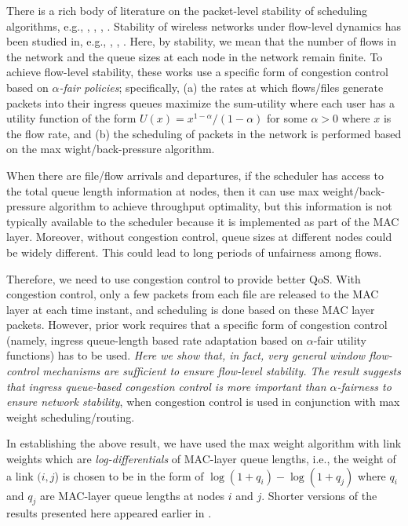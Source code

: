 \documentclass[10pt,onecolumn,draftclsnofoot,journal]{IEEEtran}
\begin{document}
There is a rich body of literature on the packet-level stability of scheduling algorithms, e.g., \cite{eph}, \cite{Neely}, \cite{KM01}, \cite{srikant}. Stability of wireless networks under flow-level dynamics
has been studied in, e.g., \cite{LNS08}, \cite{LPYCP07}, \cite{MS10}. Here, by stability, we mean
that the number of flows in the network and the queue sizes
at each node in the network remain finite. To achieve flow-level stability, these works use a specific form of congestion control based on \textit{$\alpha$-fair policies}; specifically, (a) the rates at which flows/files
generate packets into their ingress queues maximize the sum-utility where each user has a utility function of the form $U(x)=x^{1-\alpha}/(1-\alpha)$ for some $\alpha > 0$ where $x$ is the flow rate, and (b) the scheduling of packets in the network
is performed based on the max wight/back-pressure algorithm.


When there are file/flow arrivals and departures,
if the scheduler has access to the total queue length information at nodes, then it can use max weight/back-pressure algorithm to achieve throughput optimality, but this information is not typically available to the scheduler because it is implemented as part of the MAC layer. Moreover, without congestion control, queue sizes at different nodes could be widely different. This could lead to long periods of unfairness among flows.


Therefore, we need to use congestion control to provide better QoS. With congestion control, only a few packets from each file are released to the MAC layer at each time instant, and scheduling is done based on these MAC layer packets. However, prior work requires that a specific form of congestion control (namely, ingress queue-length based rate adaptation based on $\alpha$-fair utility functions) has to be used. \textit{Here we show that, in fact, very general window flow-control mechanisms are sufficient to ensure flow-level stability. The result suggests that ingress queue-based congestion control is more important than $\alpha$-fairness to ensure network stability}, when congestion control is used in conjunction with max weight scheduling/routing.


In establishing the above result, we have used the max weight algorithm with link weights which are \textit{log-differentials} of MAC-layer queue lengths, i.e., the weight of a link $(i,j$) is chosen to be in the form of $\log(1+q_i)-\log(1+q_j)$ where $q_i$ and $q_j$ are MAC-layer queue lengths at nodes $i$ and $j$.
Shorter versions of the results presented here appeared earlier in \cite{GTS12, javad, tianxiong}.
\end{document}
